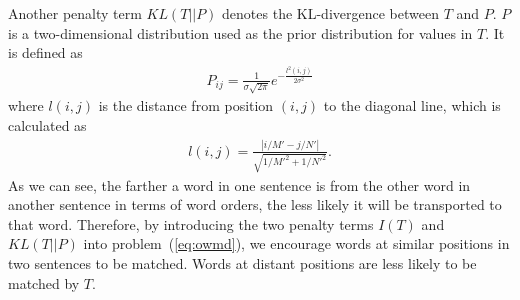 Another penalty term $KL(T||P)$ denotes the KL-divergence between $T$ and $P$. 
$P$ is a two-dimensional distribution used as the prior distribution for values in $T$. It is defined as
\begin{equation}
\label{eq:P}
\begin{split}
	P_{ij} = \frac{1}{\sigma \sqrt{2\pi}}e^{- \frac{l^2(i,j)}{2\sigma^2}}
\end{split}
\end{equation}
where $l(i, j)$ is the distance from position $(i, j)$ to the diagonal line, which is calculated as
\begin{equation}
\label{eq:l}
\begin{split}
	l(i, j) = \frac{|i/M' - j/N'|}{\sqrt{1/M'^2 + 1/N'^2}}.
\end{split}
\end{equation}
As we can see, the farther a word in one sentence is from the other word in another sentence in terms of word orders, the less likely it will be transported to that word. Therefore, by introducing the two penalty terms $I(T)$ and $KL(T||P)$ into problem~(\ref{eq:owmd}), 
we encourage words at similar positions in two sentences to be matched.
Words at distant positions are less likely to be matched by $T$.

